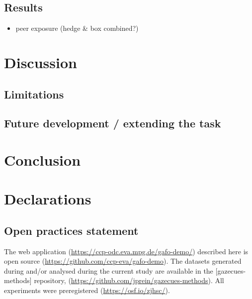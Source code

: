 \documentclass[
  english,
  man,floatsintext]{apa6}
\providecommand{\tightlist}{%
  \setlength{\itemsep}{0pt}\setlength{\parskip}{0pt}}
\begin{document}
\hypertarget{results-4}{%
\subsection{Results}\label{results-4}}

\begin{itemize}
\tightlist
\item
  peer exposure (hedge \& box combined?)
\end{itemize}

\hypertarget{discussion-1}{%
\section{Discussion}\label{discussion-1}}

\hypertarget{limitations-1}{%
\subsection{Limitations}\label{limitations-1}}

\hypertarget{future-development-extending-the-task-1}{%
\subsection{Future development / extending the task}\label{future-development-extending-the-task-1}}

\hypertarget{conclusion-1}{%
\section{Conclusion}\label{conclusion-1}}

\hypertarget{declarations}{%
\section{Declarations}\label{declarations}}

\hypertarget{open-practices-statement}{%
\subsection{Open practices statement}\label{open-practices-statement}}

The web application (\url{https://ccp-odc.eva.mpg.de/gafo-demo/}) described here is open source (\url{https://github.com/ccp-eva/gafo-demo}).
The datasets generated during and/or analysed during the current study are available in the {[}gazecues-methods{]} repository, (\url{https://github.com/jprein/gazecues-methods}). All experiments were preregistered (\url{https://osf.io/zjhsc/}).
\end{document}
